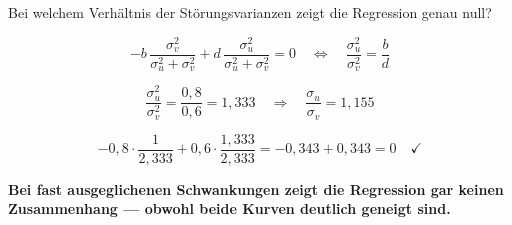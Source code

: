 \begin{aufgabe}
Bei welchem Verhältnis der Störungsvarianzen zeigt die Regression genau null?

\loesung
{}
\[ -b\,\frac{\sigma_v^{2}}{\sigma_u^{2}+\sigma_v^{2}} + d\,\frac{\sigma_u^{2}}{\sigma_u^{2}+\sigma_v^{2}} = 0 \quad\Longleftrightarrow\quad \frac{\sigma_u^{2}}{\sigma_v^{2}} = \frac{b}{d} \]

\[ \frac{\sigma_u^{2}}{\sigma_v^{2}} = \frac{0{,}8}{0{,}6} = 1{,}333 \quad\Longrightarrow\quad \frac{\sigma_u}{\sigma_v} = 1{,}155 \]

\[ -0{,}8\cdot\frac{1}{2{,}333} + 0{,}6\cdot\frac{1{,}333}{2{,}333} = -0{,}343+0{,}343 = 0 \quad \checkmark \]

\begin{center}
\begin{minipage}{0.9\textwidth}
\textbf{Bei fast ausgeglichenen Schwankungen zeigt die Regression gar keinen Zusammenhang --- obwohl beide Kurven deutlich geneigt sind.}
\end{minipage}
\end{center}

\begin{center}
\begin{minipage}{0.88\textwidth}
\end{minipage}
\end{center}
\end{aufgabe}

